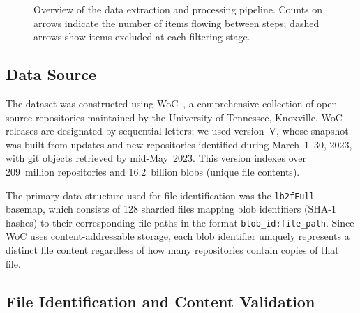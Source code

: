 \documentclass[data,datadescriptor,submit,pdftex,moreauthors]{Definitions/mdpi}
\begin{document}
\begin{figure}[H]
\caption{Overview of the data extraction and processing pipeline. Counts on arrows indicate the number of items flowing between steps; dashed arrows show items excluded at each filtering stage.\label{fig:pipeline}}
\end{figure}

\subsection{Data Source}
\label{sec:data-source}

The dataset was constructed using WoC~\cite{ma2021world}, a comprehensive collection of open-source repositories maintained by the University of Tennessee, Knoxville. WoC releases are designated by sequential letters; we used version~V, whose snapshot was built from updates and new repositories identified during March~1--30, 2023, with git objects retrieved by mid-May~2023. This version indexes over 209~million repositories and 16.2~billion blobs (unique file contents).

The primary data structure used for file identification was the \texttt{lb2fFull} basemap, which consists of 128 sharded files mapping blob identifiers (SHA-1 hashes) to their corresponding file paths in the format \texttt{blob\_id;file\_path}. Since WoC uses content-addressable storage, each blob identifier uniquely represents a distinct file content regardless of how many repositories contain copies of that file.

\subsection{File Identification and Content Validation}
\label{sec:identification-validation}
\end{document}
